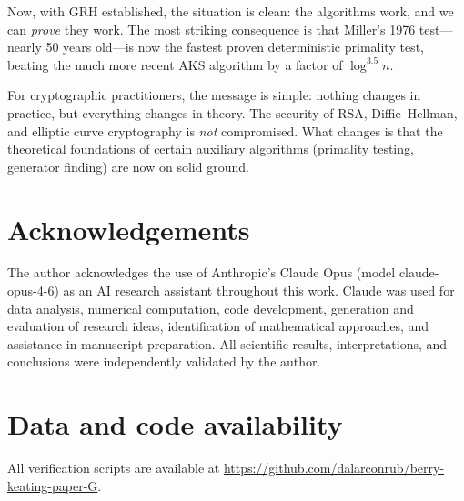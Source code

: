 \documentclass[11pt]{article}
\theoremstyle{plain}
\theoremstyle{definition}
\theoremstyle{remark}
\begin{document}
Now, with GRH established, the situation is clean: the algorithms work,
and we can \emph{prove} they work. The most striking consequence is
that Miller's 1976 test---nearly 50 years old---is now the fastest
proven deterministic primality test, beating the much more recent AKS
algorithm by a factor of $\log^{3.5} n$.

For cryptographic practitioners, the message is simple: nothing changes
in practice, but everything changes in theory. The security of RSA,
Diffie--Hellman, and elliptic curve cryptography is \emph{not}
compromised. What changes is that the theoretical foundations of
certain auxiliary algorithms (primality testing, generator finding)
are now on solid ground.


\section*{Acknowledgements}

The author acknowledges the use of Anthropic's Claude Opus
(model claude-opus-4-6) as an AI research assistant throughout this work.
Claude was used for data analysis, numerical computation, code development,
generation and evaluation of research ideas, identification of mathematical
approaches, and assistance in manuscript preparation.
All scientific results, interpretations, and conclusions were independently
validated by the author.

\section*{Data and code availability}

All verification scripts are available at
\url{https://github.com/dalarconrub/berry-keating-paper-G}.
\end{document}
